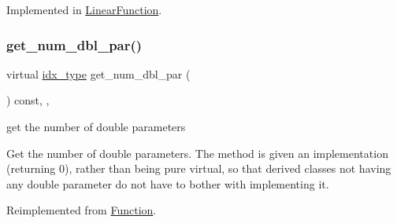 Implemented in \mbox{\hyperlink{class_s_m_spp__di__unipi__it_1_1_linear_function_ad8c41e1b26609250375600fb998b1538}{Linear\+Function}}.

\mbox{\label{class_s_m_spp__di__unipi__it_1_1_c05_function_a842fd454acaded84baf6b77e0d61a950}} 
\subsubsection{\texorpdfstring{get\+\_\+num\+\_\+dbl\+\_\+par()}{get\_num\_dbl\_par()}}
{\footnotesize\ttfamily virtual \mbox{\hyperlink{class_s_m_spp__di__unipi__it_1_1_thin_compute_interface_aa3d710629ad8c434286726ad810c3b47}{idx\+\_\+type}} get\+\_\+num\+\_\+dbl\+\_\+par (\begin{DoxyParamCaption}\item[{void}]{ }\end{DoxyParamCaption}) const\hspace{0.3cm}{\ttfamily [inline]}, {\ttfamily [override]}, {\ttfamily [virtual]}}



get the number of double parameters 

Get the number of double parameters. The method is given an implementation (returning 0), rather than being pure virtual, so that derived classes not having any double parameter do not have to bother with implementing it. 

Reimplemented from \mbox{\hyperlink{class_s_m_spp__di__unipi__it_1_1_function_a842fd454acaded84baf6b77e0d61a950}{Function}}.

\mbox{\label{class_s_m_spp__di__unipi__it_1_1_c05_function_a3ad74d9506761eb2ca4c8a936fb7a1c5}} 
